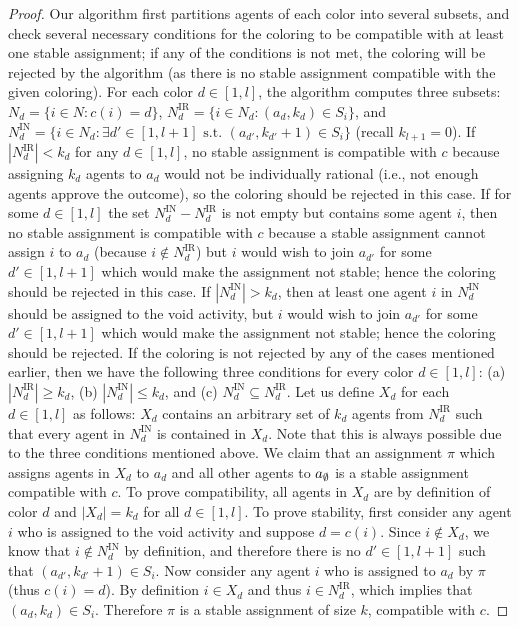 \begin{proof}
Our algorithm first partitions agents of each color into several subsets, and check several necessary conditions for the coloring to be compatible with at least one stable assignment; if any of the conditions is not met, the coloring will be rejected by the algorithm (as there is no stable assignment compatible with the given coloring). 
For each color $d\in [1, l]$, the algorithm computes three subsets: $N_d = \{i \in N : c(i) = d\}$,
 $N^{\text{IR}}_d = \{i \in N_d : (a_d, k_d) \in S_i \}$, and
 $N^{\text{IN}}_d = \{i \in N_d : \exists d'\in[1, l+1] \text{~s.t.~} (a_{d'}, k_{d'}+1) \in S_i\}$ (recall $k_{l+1} = 0$).
If $|N^{\text{IR}}_d| < k_d$ for any $d\in [1, l]$, no stable assignment is compatible with $c$ because assigning $k_d$ agents to $a_d$ would not be individually rational (i.e., not enough agents approve the outcome), so the coloring should be rejected in this case.
If for some $d \in [1, l]$ the set $N^{\text{IN}}_d - N^{\text{IR}}_d$ is not empty but contains some agent $i$, then no stable assignment is compatible with $c$ because a stable assignment cannot assign $i$ to $a_d$ (because $i\not\in N^{\text{IR}}_d$) but $i$ would wish to join $a_{d'}$ for some $d'\in [1, l+1]$ which would make the assignment not stable; hence the coloring should be rejected in this case. 
If $|N^{\text{IN}}_d| > k_d$, then at least one agent $i$ in $N^{\text{IN}}_d$ should be assigned to the void activity, but $i$ would wish to join $a_{d'}$ for some $d'\in[1, l+1]$ which would make the assignment not stable; hence the coloring should be rejected.
If the coloring is not rejected by any of the cases mentioned earlier, then we have the following three conditions for every color $d\in [1, l]$: (a) $|N^{\text{IR}}_d| \geq k_d$, (b) $|N^{\text{IN}}_d| \leq k_d$, and (c) $N^{\text{IN}}_d \subseteq N^{\text{IR}}_d$.
Let us define $X_d$ for each $d\in [1, l]$ as follows: $X_d$ contains an arbitrary set of $k_d$ agents from $N^{\text{IR}}_d$ such that every agent in $N^{\text{IN}}_d$ is contained in $X_d$. Note that this is always possible due to the three conditions mentioned above. 
We claim that an assignment $\pi$ which assigns agents in $X_d$ to $a_d$ and all other agents to $a_{\emptyset}$ is a stable assignment compatible with $c$. To prove compatibility, all agents in $X_d$ are by definition of color $d$ and $|X_d| = k_d$ for all $d\in [1, l]$.
To prove stability, first consider any agent $i$ who is assigned to the void activity and suppose $d = c(i)$. Since $i\not\in X_d$, we know that $i\not\in N^{\text{IN}}_d$ by definition, and therefore there is no $d'\in[1,l+1]$ such that $(a_{d'}, k_{d'}+1)\in S_i$. Now consider any agent $i$ who is assigned to $a_d$ by $\pi$ (thus $c(i) = d$). By definition $i\in X_d$ and thus $i\in N^{\text{IR}}_d$, which implies that $(a_d, k_d)\in S_i$. Therefore $\pi$ is a stable assignment of size $k$, compatible with $c$. 


\end{proof}
